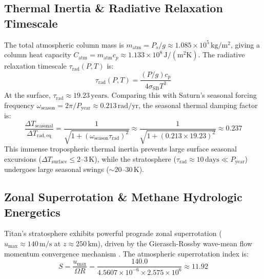 \documentclass[11pt,a4paper]{article}
\begin{document}
\subsection{Thermal Inertia \& Radiative Relaxation Timescale}
The total atmospheric column mass is $m_{\mathrm{atm}} = P_s / g \approx 1.085 \times 10^5\,\mathrm{kg/m^2}$, giving a column heat capacity $C_{\mathrm{atm}} = m_{\mathrm{atm}} c_p \approx 1.133 \times 10^8\,\mathrm{J/(m^2 K)}$. The radiative relaxation timescale $\tau_{\mathrm{rad}}(P, T)$ is:
\begin{equation}
\tau_{\mathrm{rad}}(P, T) = \frac{(P/g) c_p}{4 \sigma_{\mathrm{SB}} T^3}
\end{equation}
At the surface, $\tau_{\mathrm{rad}} \approx 19.23\,\mathrm{years}$. Comparing this with Saturn's seasonal forcing frequency $\omega_{\mathrm{season}} = 2\pi / P_{\mathrm{year}} \approx 0.213\,\mathrm{rad/yr}$, the seasonal thermal damping factor is:
\begin{equation}
\frac{\Delta T_{\mathrm{seasonal}}}{\Delta T_{\mathrm{rad,eq}}} = \frac{1}{\sqrt{1 + (\omega_{\mathrm{season}} \tau_{\mathrm{rad}})^2}} \approx \frac{1}{\sqrt{1 + (0.213 \times 19.23)^2}} \approx 0.237
\end{equation}
This immense tropospheric thermal inertia prevents large surface seasonal excursions ($\Delta T_{\mathrm{surface}} \le 2\text{--}3\,\mathrm{K}$), while the stratosphere ($\tau_{\mathrm{rad}} \approx 10\,\mathrm{days} \ll P_{\mathrm{year}}$) undergoes large seasonal swings ($\sim 20\text{--}30\,\mathrm{K}$).

\subsection{Zonal Superrotation \& Methane Hydrologic Energetics}
Titan's stratosphere exhibits powerful prograde zonal superrotation ($u_{\mathrm{max}} \approx 140\,\mathrm{m/s}$ at $z \approx 250\,\mathrm{km}$), driven by the Gierasch-Rossby wave-mean flow momentum convergence mechanism \cite{showman2006,bird2005}. The atmospheric superrotation index is:
\begin{equation}
S = \frac{u_{\mathrm{max}}}{\Omega R} = \frac{140.0}{4.5607 \times 10^{-6} \times 2.575 \times 10^6} \approx 11.92
\end{equation}
\end{document}
